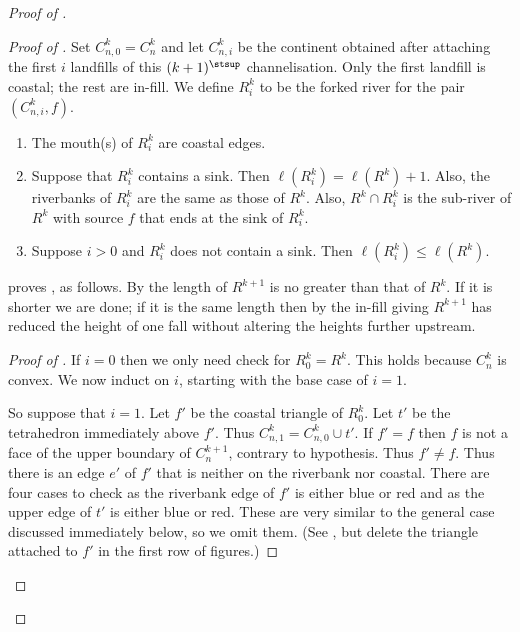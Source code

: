 \documentclass[12pt]{amsart}
\begin{document}
\begin{proof}[Proof of ]
\begin{proof}[Proof of ]
Set $C^k_{n,0} = C^k_{n}$ and let $C^k_{n,i}$ be the continent obtained after attaching the first $i$ landfills of this $(k+1)^\stsup$ channelisation.  Only the first landfill is coastal; the rest are in-fill. 
We define $R^k_i$ to be the forked river for the pair $(C^k_{n,i}, f)$.  

\begin{claim}
\label{Clm:ChannelisationInduction}
\mbox{}
\begin{enumerate}
\item
\label{Itm:CoastalEdges}
The mouth(s) of $R^k_i$ are coastal edges. 
\item
\label{Itm:ForkedRiverInduction}
Suppose that $R^k_i$ contains a sink.  Then $\ell(R^k_i) = \ell(R^k) + 1$.  Also, the riverbanks of $R^k_i$ are the same as those of $R^k$.  Also, $R^k \cap R^k_i$ is the sub-river of $R^k$ with source $f$ that ends at the sink of $R^k_i$.  
\item
\label{Itm:RiverInduction}
Suppose $i > 0$ and $R^k_i$ does not contain a sink.  Then $\ell(R^k_i) \leq \ell(R^k)$.  
\end{enumerate}
\end{claim}

 proves , as follows.  By  the length of $R^{k+1}$ is no greater than that of $R^k$.  If it is shorter we are done; if it is the same length then by  the in-fill giving $R^{k+1}$ has reduced the height of one fall without altering the heights further upstream.

\begin{proof}[Proof of ]
If $i = 0$ then we only need check  for $R^k_0 = R^k$.  This holds because $C^k_n$ is convex.  We now induct on $i$, starting with the base case of $i = 1$.  

So suppose that $i = 1$.  Let $f'$ be the coastal triangle of $R^k_0$.  Let $t'$ be the tetrahedron immediately above $f'$.  Thus $C^k_{n,1} = C^k_{n,0} \cup t'$.  If $f' = f$ then $f$ is not a face of the upper boundary of $C^{k+1}_n$, contrary to hypothesis.  Thus $f' \neq f$.  Thus there is an edge $e'$ of $f'$ that is neither on the riverbank nor coastal.   There are four cases to check as the riverbank edge of $f'$ is either blue or red and as the upper edge of $t'$ is either blue or red.  These are very similar to the general case discussed immediately below, so we omit them.  (See , but delete the triangle attached to $f'$ in the first row of figures.)


\end{proof}
\end{proof}
\end{proof}
\end{document}
